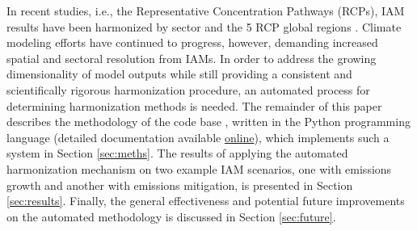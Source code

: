 In recent studies, i.e., the Representative Concentration Pathways (RCPs), IAM
results have been harmonized by sector and the 5 RCP global regions
\cite{vuuren_representative_2011}. Climate modeling efforts have continued to
progress, however, demanding increased spatial and sectoral resolution from
IAMs. In order to address the growing dimensionality of model outputs while
still providing a consistent and scientifically rigorous harmonization
procedure, an automated process for determining harmonization methods is
needed. The remainder of this paper describes the methodology of the
 code base \cite{matthew_gidden_2017_802832}, written in the Python
programming language (detailed documentation available
\href{http://mattgidden.com/aneris/}{online}), which implements such a system in
Section \ref{sec:meths}. The results of applying the automated harmonization
mechanism on two example IAM scenarios, one with emissions growth and another
with emissions mitigation, is presented in Section \ref{sec:results}. Finally,
the general effectiveness and potential future improvements on the automated
methodology is discussed in Section \ref{sec:future}.

